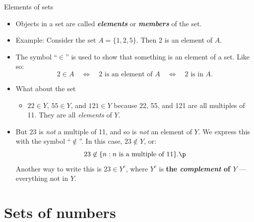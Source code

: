 \documentclass[11pt,aspectratio=1610]{beamer}
\begin{document}
\begin{frame}{Elements of sets}\p
	\begin{itemize}
		\item Objects in a set are called \emph{\textbf{elements}} or \emph{\textbf{members}} of the set. \p
		\item Example: Consider the set $A = \{1,2,5\}$. Then 2 is an element of $A$. \p
		\item The symbol ``$\in$'' is used to show that something is an element of a set. \p Like so: 
		\[
		2 \in A \quad \iff \quad 2 \textrm{ is an element of } A \quad \iff \quad 2 \textrm{ is in } A.
		\]
		\item What about the set\\  \p
		\begin{itemize}
			\item $22 \in Y$, $55 \in Y$, and $121 \in Y$ because 22, 55, and 121 are all multiples of 11. They are all \emph{elements} of $Y$. 
		\end{itemize}\p
		\item But $23$ is \emph{not} a multiple of 11, and so is \emph{not} an element of $Y$. \p We express this with the symbol ``$\not\in$''. In this case, $23 \not\in Y$, or:\p
		\[
		23 \not\in \{n : n \textrm{ is a multiple of 11}\}.\p
		\]
		Another way to write this is $23 \in Y^c$, where $Y^c$ is \textbf{the \emph{complement} of $Y$} --- everything not in $Y$. 
	\end{itemize}
\end{frame}

\section{Sets of numbers}
\end{document}
